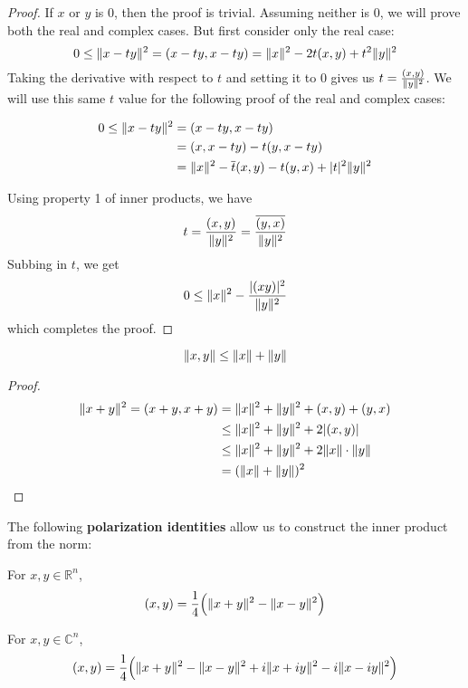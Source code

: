 \begin{proof}
If $x$ or $y$ is 0, then the proof is trivial. Assuming neither is 0, we will prove both the real and complex cases. But first consider only the real case: 
$$0 \leq \lVert x - ty\rVert^{2} = (x - ty, x - ty) = \lVert x\rVert^{2} - 2t(x, y) + t^{2} \lVert y\rVert^{2} $$
Taking the derivative with respect to $t$ and setting it to 0 gives us $t = \frac{(x, y)}{\lVert y\rVert^{2}}$. We will use this same $t$ value for the following proof of the real and complex cases:

$$
\begin{aligned}
0 \leq \lVert x-ty\rVert^{2} &= (x - ty, x - ty) \\ 
&= (x, x - ty) -t(y, x - ty) \\
&= \lVert x\rVert^{2} - \overline{t} (x, y) -t (y, x) + \lvert t\rvert^{2} \lVert y\rVert^{2}
\end{aligned}
$$

Using property 1 of inner products, we have 
$$t = \frac{(x, y)}{\lVert y\rVert^{2}} = \frac{\overline{(y, x)}}{\lVert y\rVert^{2}}$$
Subbing in $t$, we get 
$$ 0 \leq \lVert x\rVert^{2} - \frac{\lvert(x y)\rvert^{2}}{\lVert y\rVert^{2}}$$
which completes the proof. 
\end{proof}

\begin{theorem}
$$\lVert x, y\rVert \leq \lVert x\rVert + \lVert y\rVert$$
\end{theorem}

\begin{proof}
$$
\begin{aligned}
\lVert x + y\rVert^{2} = (x + y, x + y) &= \lVert x\rVert^{2} + \lVert y\rVert^{2} + (x, y) + (y, x) \\
&\leq \lVert x\rVert^{2} + \lVert y\rVert^{2} + 2 \lvert(x, y)\rvert \\
&\leq \lVert x\rVert^{2} + \lVert y\rVert^{2} + 2 \lVert x\rVert \cdot \lVert y\rVert \\
&= (\lVert x\rVert + \lVert y\rVert)^{2}
\end{aligned}
$$
\end{proof}

\begin{theorem}
The following \textbf{polarization identities} allow us to construct the inner product from the norm: 

For $x, y \in \mathbb{R}^{n}$, 
$$(x, y) = \frac{1}{4} \Big( \lVert x + y\rVert^{2} - \lVert x - y\rVert^{2} \Big) $$

For $x, y \in \mathbb{C}^{n}$, 
$$(x, y) = \frac{1}{4} \Big( \lVert x + y\rVert^{2} - \lVert x - y\rVert^{2} +i \lVert x + iy\rVert^{2} -i \lVert x - iy\rVert^{2} \Big)$$
\end{theorem}

